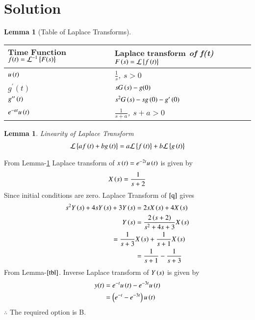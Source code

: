 \documentclass[journal,12pt,twocolumn]{IEEEtran}
\newtheorem{lemma}[theorem]{Lemma}
\begin{document}
\section{Solution}
\begin{lemma}[Table of Laplace Transforms]\label{tbl}
\begin{center}
\begin{tabular}{ |m{3cm}|m{4.5cm}| } 
 \hline
 $\textbf{Time Function}$ $f(t)=\mathcal{L}^{-1}\left\{F(s)\right\}$ & $\textbf{Laplace transform}$ of f(t) $F\left(s\right)=\mathcal{L}\left\{f\left(t\right)\right\}$ \\ 
 \hline
 $u\left(t\right)$ & $\frac{1}{s}$, $s>0$ \\ 
 \hline
 $g^{\prime}(t)$ & $sG\left(s\right)-g(0)$ \\ 
 \hline
 $g^{\prime\prime}\left(t\right)$ & $s^2G\left(s\right)-sg\left(0\right)-g^{\prime}\left(0\right)$\\
 \hline
 $e^{-at}u\left(t\right)$ & $\frac{1}{s+a}$, $s+a>0$\\
 \hline
\end{tabular}
\end{center}
\end{lemma}
\begin{lemma}{Linearity of Laplace Transform}
\begin{align}
    \mathcal{L}\left\{af\left(t\right)+bg\left(t\right)\right\}=a\mathcal{L}\left\{f\left(t\right)\right\}+b\mathcal{L}\left\{g\left(t\right)\right\}
\end{align}
\end{lemma}
From Lemma-\ref{tbl} Laplace transform of $x\left(t\right)=e^{-2t}u\left(t\right)$ is given by
\begin{align}
    X\left(s\right)=\frac{1}{s+2}
\end{align}
Since initial conditions are zero. Laplace Transform of $\eqref{q}$ gives
\begin{align}
    s^{2}Y\left(s\right)+4sY\left(s\right)+3Y\left(s\right)&=2sX\left(s\right)+4X\left(s\right)\\
    Y\left(s\right)&=\frac{2\left(s+2\right)}{s^2+4s+3}X\left(s\right)\\
    = \frac{1}{s+3}&X\left(s\right)+\frac{1}{s+1}X\left(s\right)\label{hc}\\
    &=\frac{1}{s+1}-\frac{1}{s+3}
\end{align}
From Lemma-$\ref{tbl}$. Inverse Laplace transform of $Y\left(s\right)$ is given by
\begin{align}
    y(t)&=e^{-t}u\left(t\right)-e^{-3t}u\left(t\right)\\
    &=\left(e^{-t}-e^{-3t}\right)u\left(t\right)
\end{align}
$\therefore$ The required option is B.
\end{document}
